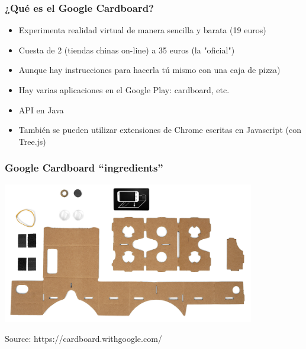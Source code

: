 
\begin{frame}
\frametitle{¿Qué es el Google Cardboard?}

\begin{itemize}
   \item Experimenta realidad virtual de manera sencilla y barata (19 euros)
   \item Cuesta de 2 (tiendas chinas on-line) a 35 euros (la "oficial")
   \item Aunque hay instrucciones para hacerla tú mismo con una caja de pizza)
   \item Hay varias aplicaciones en el Google Play: cardboard, etc.
   \item API en Java
   \item También se pueden utilizar extensiones de Chrome escritas en Javascript (con Tree.js)
\end{itemize}

\end{frame}



\begin{frame}
\frametitle{Google Cardboard ``ingredients''}

\begin{center}
  \includegraphics[width=11cm]{figs/ingredients.png}
\end{center}


\begin{flushright}
{\tiny
Source: https://cardboard.withgoogle.com/
}
\end{flushright}

\end{frame}


